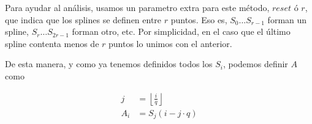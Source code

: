 Para ayudar al an\'alisis, usamos un parametro extra para este m\'etodo,
$reset$ \'o $r$, que indica que los splines se definen entre $r$ puntos. Eso es,
$S_0 \ldots S_{r - 1}$ forman un spline, $S_r \ldots S_{2r - 1}$ forman otro,
etc. Por simplicidad, en el caso que el \'ultimo spline contenta menos de $r$
puntos lo unimos con el anterior.

De esta manera, y como ya tenemos definidos todos los $S_i$, podemos definir $A$ como

\[
\begin{split}
j & = \left\lfloor \frac{i}{q} \right\rfloor \\
A_i & = S_j(i - j \cdot q)
\end{split}
\]
